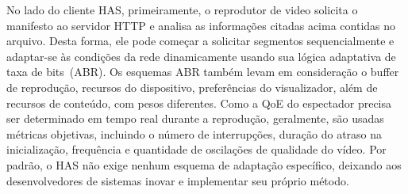 No lado do cliente HAS, primeiramente, o reprodutor de video solicita o manifesto ao servidor HTTP e analisa as informações citadas acima contidas no arquivo. Desta forma, ele pode começar a solicitar segmentos sequencialmente e adaptar-se às condições da rede dinamicamente usando sua lógica adaptativa de taxa de bits~(ABR). Os esquemas ABR também levam em consideração o buffer de reprodução, recursos do dispositivo, preferências do visualizador, além de recursos de conteúdo, com pesos diferentes. 
Como a QoE do espectador precisa ser determinado em tempo real durante a reprodução, geralmente, são usadas métricas objetivas, incluindo o número de interrupções, duração do atraso na inicialização, frequência e quantidade de oscilações de qualidade do vídeo. Por padrão, o HAS não exige nenhum esquema de adaptação específico, deixando aos desenvolvedores de sistemas inovar e implementar seu próprio método.




